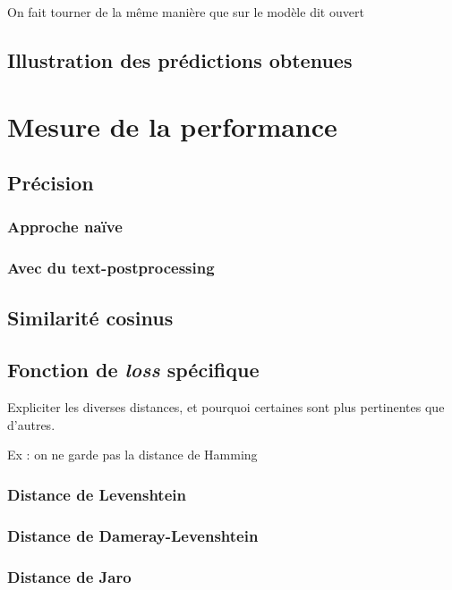         On fait tourner de la même manière que sur le modèle dit \og ouvert \fg

        \section{Illustration des prédictions obtenues}


    \chapter{Mesure de la performance}
    
        \section{Précision}
            \subsection{Approche naïve}

            \subsection{Avec du \og text-postprocessing \fg}
        
        \section{Similarité cosinus}

        \section{Fonction de \emph{loss} spécifique}

        Expliciter les diverses distances, et pourquoi certaines sont plus pertinentes que d'autres.

        Ex : on ne garde pas la distance de Hamming
            \subsection{Distance de Levenshtein}

            \subsection{Distance de Dameray-Levenshtein}

            \subsection{Distance de Jaro}

